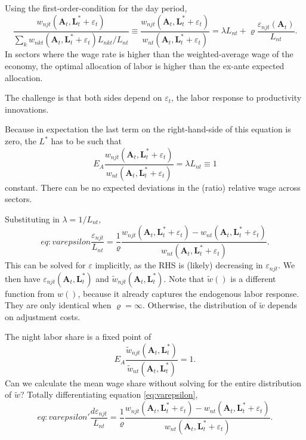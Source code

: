 \documentclass[12pt]{article}
\begin{document}
Using the first-order-condition for the day period,
\[
\frac 
	{w_{njt}(\mathbf A_{t}, \mathbf L_{t}^*+\varepsilon_t)}
	{\sum_k w_{nkt}(\mathbf A_{t}, \mathbf L_{t}^*+\varepsilon_t)L_{nkt}/L_{nt}}
\equiv 
\frac 
	{w_{njt}(\mathbf A_{t}, \mathbf L_{t}^*+\varepsilon_t)}
	{w_{nt}(\mathbf A_{t}, \mathbf L_{t}^*+\varepsilon_t)}
= \lambda L_{nt}+
		\varrho 
				\frac {\varepsilon_{njt}(\mathbf A_t)} {L_{nt}}
.
\]
In sectors where the wage rate is higher than the weighted-average wage of the economy, the optimal allocation of labor is higher than the ex-ante expected allocation.

The challenge is that both sides depend on $\varepsilon_t$, the labor response to productivity innovations.

Because in expectation the last term on the right-hand-side of this equation is zero, the $L^*$ has to be such that
\[
E_{A}\frac 
	{w_{njt}(\mathbf A_{t}, \mathbf L_{t}^*+\varepsilon_t)}
	{w_{nt}(\mathbf A_{t}, \mathbf L_{t}^*+\varepsilon_t)}
= \lambda L_{nt} \equiv 1
\]
constant. There can be no expected deviations in the (ratio) relative wage across sectors. 

Substituting in $\lambda = 1/L_{nt}$,
\begin{equation}{eq:varepsilon}
\frac {\varepsilon_{njt}} {L_{nt}}
=
\frac 1\varrho
\frac 
	{w_{njt}(\mathbf A_{t}, \mathbf L_{t}^*+\varepsilon_t)-w_{nt}(\mathbf A_{t}, \mathbf L_{t}^*+\varepsilon_t)}
	{w_{nt}(\mathbf A_{t}, \mathbf L_{t}^*+\varepsilon_t)}
.
\end{equation}
This can be solved for $\varepsilon$ implicitly, as the RHS is (likely) decreasing in $\varepsilon_{njt}$. We then have $\varepsilon_{njt}(\mathbf A_t, \mathbf L_t^*)$ and $\tilde w_{njt}(\mathbf A_t, \mathbf L_t^*)$. Note that $\tilde w()$ is a different function from $w()$, because it already captures the endogenous labor response. They are only identical when $\varrho=\infty$. Otherwise, the distribution of $\tilde w$ depends on adjustment costs. 

The night labor share is a fixed point of
\[
E_{A}\frac 
	{\tilde w_{njt}(\mathbf A_{t}, \mathbf L_{t}^*)}
	{\tilde w_{nt}(\mathbf A_{t}, \mathbf L_{t}^*)}
= 1.
\]
Can we calculate the mean wage share without solving for the entire distribution of $\tilde w$? Totally differentiating equation \eqref{eq:varepsilon},
\begin{equation}{eq:varepsilon'}
\frac {d\varepsilon_{njt}} {L_{nt}}
=
\frac 1\varrho
\frac 
	{w_{njt}(\mathbf A_{t}, \mathbf L_{t}^*+\varepsilon_t)-w_{nt}(\mathbf A_{t}, \mathbf L_{t}^*+\varepsilon_t)}
	{w_{nt}(\mathbf A_{t}, \mathbf L_{t}^*+\varepsilon_t)}
.
\end{equation}
\end{document}
